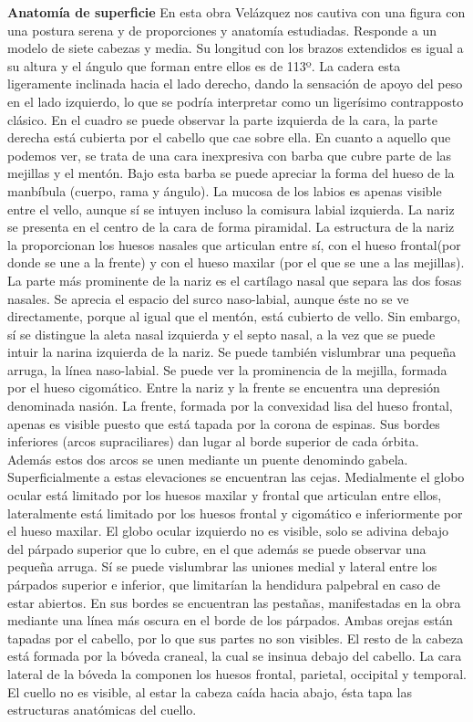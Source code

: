 \textbf{Anatomía de superficie}
En esta obra Velázquez nos cautiva con una figura con una postura serena y de proporciones y anatomía estudiadas. Responde a un modelo de siete cabezas y media. Su longitud con los brazos extendidos es igual a su altura y el ángulo que forman entre ellos es de 113º. La cadera esta ligeramente inclinada hacia el lado derecho, dando la sensación de apoyo del peso en el lado izquierdo, lo que se podría interpretar como un ligerísimo contrapposto clásico.
En el cuadro se puede observar la parte izquierda de la cara, la parte derecha está cubierta por el cabello que cae sobre ella. En cuanto a aquello que podemos ver, se trata de una cara inexpresiva con barba que cubre parte de las mejillas y el mentón. Bajo esta barba se puede apreciar la forma del hueso de la manbíbula (cuerpo, rama y ángulo). La mucosa de los labios es apenas visible entre el vello, aunque sí se intuyen incluso la comisura labial izquierda. La nariz se presenta en el centro de la cara de forma piramidal. La estructura de la nariz la proporcionan los huesos nasales que articulan entre sí, con el hueso frontal(por donde se une a la frente) y con el hueso maxilar (por el que se une  a las mejillas). La parte más prominente de la nariz es el cartílago nasal que separa las dos fosas nasales. Se aprecia el espacio del surco naso-labial, aunque éste no se ve directamente, porque al igual que el mentón, está cubierto de vello. Sin embargo, sí se distingue la aleta nasal izquierda y el septo nasal, a la vez que se puede intuir la narina izquierda de la nariz. Se puede también vislumbrar una pequeña arruga, la línea naso-labial. Se puede ver la prominencia de la mejilla, formada por el hueso cigomático. Entre la nariz y la frente se encuentra una depresión denominada nasión. La frente, formada por la convexidad lisa del hueso frontal, apenas es visible puesto que está tapada por la corona de espinas. Sus bordes inferiores (arcos supraciliares) dan lugar al borde superior de cada órbita. Además estos dos arcos se unen mediante un puente denomindo gabela. Superficialmente a estas elevaciones se encuentran las cejas. Medialmente el globo ocular está limitado por los huesos maxilar y frontal que articulan entre ellos, lateralmente está limitado por los huesos frontal y cigomático e inferiormente por el hueso maxilar. El globo ocular izquierdo no es visible, solo se adivina debajo del párpado superior que lo cubre, en el que además se puede observar una pequeña arruga. Sí se puede vislumbrar las uniones medial y lateral entre los párpados superior e inferior, que limitarían la hendidura palpebral en caso de estar abiertos. En sus bordes se encuentran las pestañas, manifestadas en la obra mediante una línea más oscura en el borde de los párpados. Ambas orejas están tapadas por el cabello, por lo que sus partes no son visibles.
El resto de la cabeza está formada por la bóveda craneal, la cual se insinua debajo del cabello. La cara lateral de la bóveda la componen los huesos frontal, parietal, occipital y temporal.
El cuello no es visible, al estar la cabeza caída hacia abajo, ésta tapa las estructuras anatómicas del cuello.

